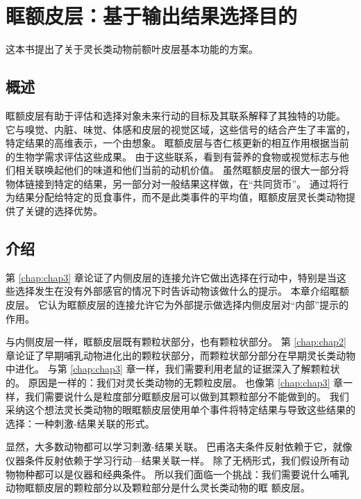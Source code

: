 \chapter{眶额皮层：基于输出结果选择目的}\label{chap:chap4}

这本书提出了关于灵长类动物前额叶皮层基本功能的方案。



\section{概述}

眶额皮层有助于评估和选择对象未来行动的目标及其联系解释了其独特的功能。 
它与嗅觉、内脏、味觉、体感和皮层的视觉区域，这些信号的结合产生了丰富的，特定结果的高维表示，一个由想象。
眶额皮层与杏仁核更新的相互作用根据当前的生物学需求评估这些成果。
由于这些联系，看到有营养的食物或视觉标志与他们相关联唤起他们的味道和他们当前的动机价值。 
虽然眶额皮层的很大一部分将物体链接到特定的结果，另一部分对一般结果这样做，在“共同货币”。
通过将行为结果分配给特定的觅食事件，而不是此类事件的平均值，眶额皮层灵长类动物提供了关键的选择优势。



\section{介绍}

第 \ref{chap:chap3} 章论证了内侧皮层的连接允许它做出选择在行动中，特别是当这些选择发生在没有外部感官的情况下时告诉动物该做什么的提示。
本章介绍眶额皮层。
它认为眶额皮层的连接允许它为外部提示做选择内侧皮层对“内部”提示的作用。\par


与内侧皮层一样，眶额皮层既有颗粒状部分，也有颗粒状部分。
第 \ref{chap:chap2} 章论证了早期哺乳动物进化出的颗粒状部分，而颗粒状部分部分在早期灵长类动物中进化。
与第 \ref{chap:chap3} 章一样，我们需要利用老鼠的证据深入了解颗粒状的。
原因是一样的：我们对灵长类动物的无颗粒皮层。
也像第 \ref{chap:chap3} 章一样，我们需要说什么是粒度部分眶额皮层可以做到其颗粒部分不能做到的。
我们采纳这个想法灵长类动物的眼眶额皮层使用单个事件将特定结果与导致这些结果的选择：一种刺激-结果关联的形式。\par


显然，大多数动物都可以学习刺激-结果关联。
巴甫洛夫条件反射依赖于它，就像仪器条件反射依赖于学习行动—结果关联一样。
除了无柄形式，我们假设所有动物物种都可以是仪器和经典条件。
所以我们面临一个挑战：我们需要说什么哺乳动物眶额皮层的颗粒部分以及颗粒部分是什么灵长类动物的眶 额皮层。\par



